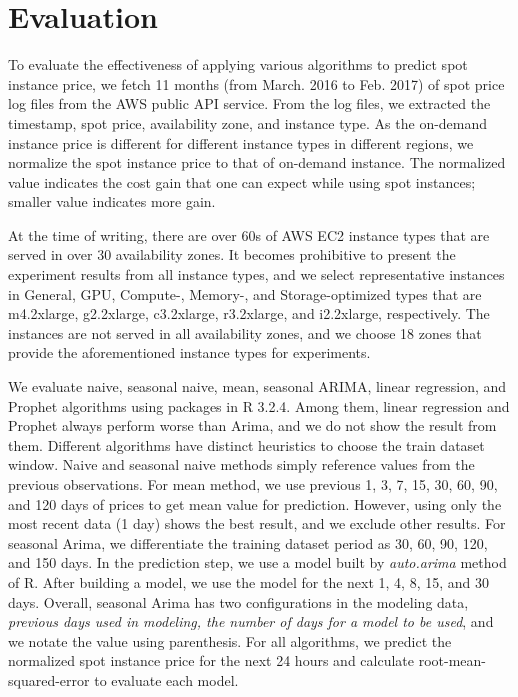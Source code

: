 \documentclass[graybox]{svmult}
\begin{document}
\section{Evaluation}
To evaluate the effectiveness of applying various algorithms to predict spot instance price, we fetch 11 months (from March. 2016 to Feb. 2017) of spot price log files from the AWS public API service. From the log files, we extracted the timestamp, spot price, availability zone, and instance type. As the on-demand instance price is different for different instance types in different regions, we normalize the spot instance price to that of on-demand instance. The normalized value indicates the cost gain that one can expect while using spot instances; smaller value indicates more gain.

At the time of writing, there are over 60s of AWS EC2 instance types that are served in over 30 availability zones. It becomes prohibitive to present the experiment results from all instance types, and we select representative instances in General, GPU, Compute-, Memory-, and Storage-optimized types that are m4.2xlarge, g2.2xlarge, c3.2xlarge, r3.2xlarge, and i2.2xlarge, respectively. The instances are not served in all availability zones, and we choose 18 zones that provide the aforementioned instance types for experiments.

We evaluate naive, seasonal naive, mean, seasonal ARIMA, linear regression, and Prophet algorithms using packages in R 3.2.4. Among them, linear regression and Prophet always perform worse than Arima, and we do not show the result from them. Different algorithms have distinct heuristics to choose the train dataset window. Naive and seasonal naive methods simply reference values from the previous observations. For mean method, we use previous 1, 3, 7, 15, 30, 60, 90, and 120 days of prices to get mean value for prediction. However, using only the most recent data (1 day) shows the best result, and we exclude other results. For seasonal Arima, we differentiate the training dataset period as 30, 60, 90, 120, and 150 days. In the prediction step, we use a model built by \textit{auto.arima} method of R. After building a model, we use the model for the next 1, 4, 8, 15, and 30 days. Overall, seasonal Arima has two configurations in the modeling data, \emph{previous days used in modeling, the number of days for a model to be used}, and we notate the value using parenthesis. For all algorithms, we predict the normalized spot instance price for the next 24 hours and calculate root-mean-squared-error to evaluate each model.
\end{document}
